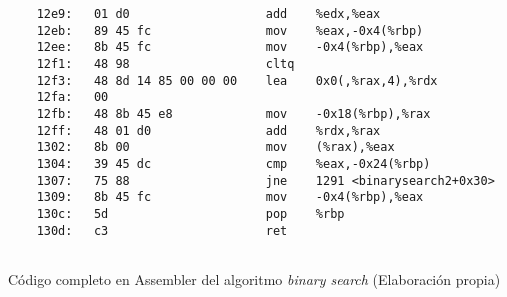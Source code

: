 \begin{mycode}
\begin{verbatim}
    12e9:	01 d0                	add    %edx,%eax
    12eb:	89 45 fc             	mov    %eax,-0x4(%rbp)
    12ee:	8b 45 fc             	mov    -0x4(%rbp),%eax
    12f1:	48 98                	cltq
    12f3:	48 8d 14 85 00 00 00 	lea    0x0(,%rax,4),%rdx
    12fa:	00 
    12fb:	48 8b 45 e8          	mov    -0x18(%rbp),%rax
    12ff:	48 01 d0             	add    %rdx,%rax
    1302:	8b 00                	mov    (%rax),%eax
    1304:	39 45 dc             	cmp    %eax,-0x24(%rbp)
    1307:	75 88                	jne    1291 <binarysearch2+0x30>
    1309:	8b 45 fc             	mov    -0x4(%rbp),%eax
    130c:	5d                   	pop    %rbp
    130d:	c3                   	ret
    
    \end{verbatim}
    \caption[Código completo en Assembler del algoritmo \textit{binary search}]{Código completo en Assembler del algoritmo \textit{binary search} (Elaboración propia)}
    \label{cod:binarySearchAsm_completo}
\end{mycode}